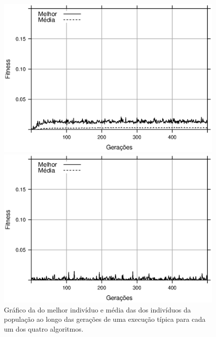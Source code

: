 \begin{figure}[H]
    \begin{minipage}{.47\textwidth}
        \includegraphics[width=\textwidth]{figures/fitness-PSO}
    \end{minipage}%
    \begin{minipage}{.47\textwidth}
        \includegraphics[width=\textwidth]{figures/fitness-DPSO}
    \end{minipage}

    \caption{Gráfico da \fitness do melhor indivíduo e média das \fitnessp dos indivíduos da população ao longo das gerações de uma execução típica para cada um dos quatro algoritmos.}
    \label{fig:fitness-gen}
\end{figure}

